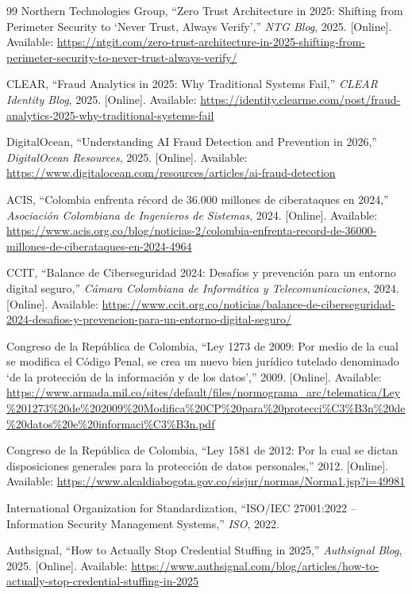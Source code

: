 \documentclass[12pt, a4paper]{article}
\begin{document}
\begin{thebibliography}{99}
Northern Technologies Group, ``Zero Trust Architecture in 2025: Shifting
from Perimeter Security to `Never Trust, Always Verify',''
\textit{NTG Blog}, 2025. [Online]. Available:
\url{https://ntgit.com/zero-trust-architecture-in-2025-shifting-from-perimeter-security-to-never-trust-always-verify/}

CLEAR, ``Fraud Analytics in 2025: Why Traditional Systems Fail,''
\textit{CLEAR Identity Blog}, 2025. [Online]. Available:
\url{https://identity.clearme.com/post/fraud-analytics-2025-why-traditional-systems-fail}

DigitalOcean, ``Understanding AI Fraud Detection and Prevention in 2026,''
\textit{DigitalOcean Resources}, 2025. [Online]. Available:
\url{https://www.digitalocean.com/resources/articles/ai-fraud-detection}

ACIS, ``Colombia enfrenta récord de 36.000 millones de ciberataques en
2024,'' \textit{Asociación Colombiana de Ingenieros de Sistemas}, 2024.
[Online]. Available:
\url{https://www.acis.org.co/blog/noticias-2/colombia-enfrenta-record-de-36000-millones-de-ciberataques-en-2024-4964}

CCIT, ``Balance de Ciberseguridad 2024: Desafíos y prevención para un
entorno digital seguro,'' \textit{Cámara Colombiana de Informática y
Telecomunicaciones}, 2024. [Online]. Available:
\url{https://www.ccit.org.co/noticias/balance-de-ciberseguridad-2024-desafios-y-prevencion-para-un-entorno-digital-seguro/}

Congreso de la República de Colombia, ``Ley 1273 de 2009: Por medio de la
cual se modifica el Código Penal, se crea un nuevo bien jurídico tutelado
denominado `de la protección de la información y de los datos','' 2009.
[Online]. Available:
\url{https://www.armada.mil.co/sites/default/files/normograma_arc/telematica/Ley\%201273\%20de\%202009\%20Modifica\%20CP\%20para\%20protecci\%C3\%B3n\%20de\%20datos\%20e\%20informaci\%C3\%B3n.pdf}

Congreso de la República de Colombia, ``Ley 1581 de 2012: Por la cual se
dictan disposiciones generales para la protección de datos personales,''
2012. [Online]. Available:
\url{https://www.alcaldiabogota.gov.co/sisjur/normas/Norma1.jsp?i=49981}

International Organization for Standardization, ``ISO/IEC 27001:2022 --
Information Security Management Systems,'' \textit{ISO}, 2022.

Authsignal, ``How to Actually Stop Credential Stuffing in 2025,''
\textit{Authsignal Blog}, 2025. [Online]. Available:
\url{https://www.authsignal.com/blog/articles/how-to-actually-stop-credential-stuffing-in-2025}

\end{thebibliography}
\end{document}
